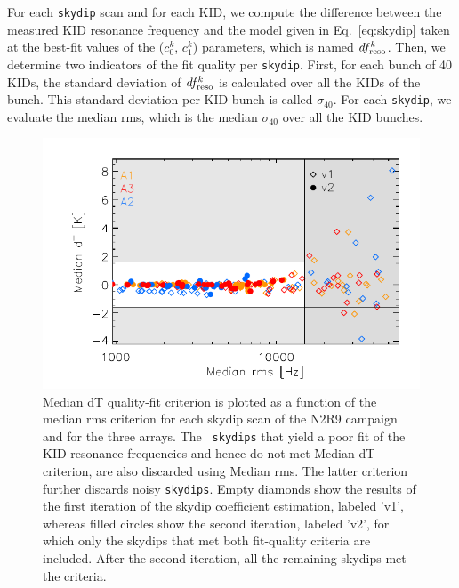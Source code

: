 For each {\tt skydip} scan and %
for each KID, 
we compute the difference between the measured KID resonance frequency and the model
given in Eq.~\ref{eq:skydip} taken at the best-fit values of the
($c_0^k$, $c_1^k$) parameters{\lp, which is named $df_{\rm{reso}}^k$.} Then, we
determine two indicators of the fit quality per {\tt skydip}. {\lp First,
for each bunch of 40 KIDs, the standard deviation of $df_{\rm{reso}}^k$ is calculated
over all the KIDs of the bunch. This standard deviation per KID bunch
is called $\sigma_{40}$. For each {\tt skydip}, we evaluate the
median rms, which is the median $\sigma_{40}$ over all the KID bunches.} 
%
\begin{figure}[!htbp]
\begin{center}
\includegraphics[clip=true,width=\linewidth]{Figures/plot_skydip_selection_two_crit.pdf}
\caption[N2R9 skydip scan selection.]{ Median dT quality-fit criterion
is plotted as a function of the median rms criterion for each skydip
scan of the N2R9 campaign and for the three arrays. {\lp The {\tt
skydips} that yield a poor fit of the KID resonance frequencies and hence
do not met Median dT criterion, are also discarded using
Median rms. The latter criterion further discards noisy {\tt skydips}.}
Empty diamonds show the results of the first
iteration of the skydip coefficient estimation, labeled 'v1', whereas
filled circles show the second iteration, labeled 'v2', for which only the skydips
that met both fit-quality criteria are included.
After the second iteration, all the remaining skydips met the criteria.}
\label{fig:skydipselection}
\end{center}
\end{figure}
